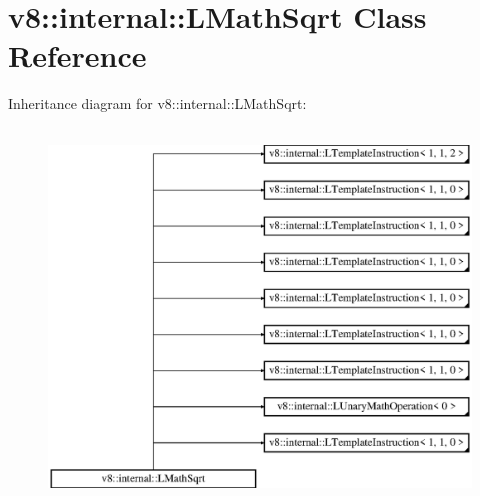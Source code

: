 \hypertarget{classv8_1_1internal_1_1_l_math_sqrt}{}\section{v8\+:\+:internal\+:\+:L\+Math\+Sqrt Class Reference}
\label{classv8_1_1internal_1_1_l_math_sqrt}
Inheritance diagram for v8\+:\+:internal\+:\+:L\+Math\+Sqrt\+:\begin{figure}[H]
\begin{center}
\leavevmode
\includegraphics[height=10.000000cm]{classv8_1_1internal_1_1_l_math_sqrt}
\end{center}
\end{figure}
